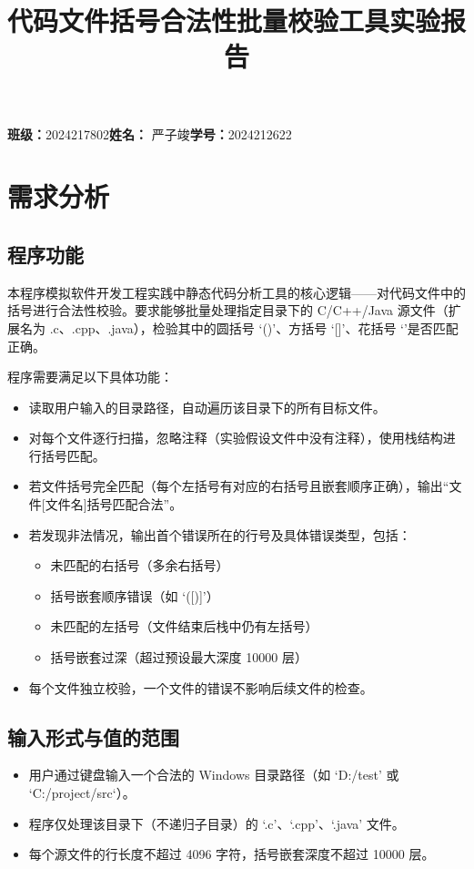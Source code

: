 \documentclass[UTF8]{ctexart}
\title{代码文件括号合法性批量校验工具实验报告}
\author{}
\begin{document}
\maketitle

\begin{center}
    \textbf{班级：}2024217802\quad \textbf{姓名：} 严子竣\quad \textbf{学号：}2024212622
\end{center}

\section{需求分析}

\subsection{程序功能}
本程序模拟软件开发工程实践中静态代码分析工具的核心逻辑——对代码文件中的括号进行合法性校验。要求能够批量处理指定目录下的 C/C++/Java 源文件（扩展名为 .c、.cpp、.java），检验其中的圆括号 ‘()’、方括号 ‘[]’、花括号 ‘{}’是否匹配正确。

程序需要满足以下具体功能：
\begin{itemize}
    \item 读取用户输入的目录路径，自动遍历该目录下的所有目标文件。
    \item 对每个文件逐行扫描，忽略注释（实验假设文件中没有注释），使用栈结构进行括号匹配。
    \item 若文件括号完全匹配（每个左括号有对应的右括号且嵌套顺序正确），输出“文件[文件名]括号匹配合法”。
    \item 若发现非法情况，输出首个错误所在的行号及具体错误类型，包括：
        \begin{itemize}
            \item 未匹配的右括号（多余右括号）
            \item 括号嵌套顺序错误（如 ‘([)]’）
            \item 未匹配的左括号（文件结束后栈中仍有左括号）
            \item 括号嵌套过深（超过预设最大深度 10000 层）
        \end{itemize}
    \item 每个文件独立校验，一个文件的错误不影响后续文件的检查。
\end{itemize}

\subsection{输入形式与值的范围}
\begin{itemize}
    \item 用户通过键盘输入一个合法的 Windows 目录路径（如 ‘D:/test’ 或 ‘C:/project/src‘）。
    \item 程序仅处理该目录下（不递归子目录）的 ‘.c’、‘.cpp’、‘.java’ 文件。
    \item 每个源文件的行长度不超过 4096 字符，括号嵌套深度不超过 10000 层。
\end{itemize}
\end{document}
